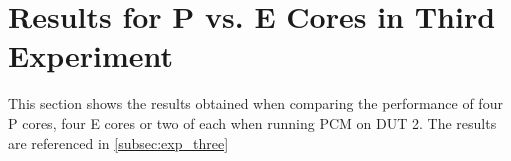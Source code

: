 \section{Results for P vs. E Cores in Third Experiment}\label{app:bonus-results}

This section shows the results obtained when comparing the performance of four P cores, four E cores or two of each when running PCM on DUT 2. The results are referenced in \cref{subsec:exp_three}


